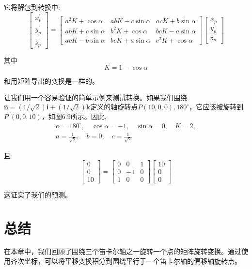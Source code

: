它将解包到转换中:
$$
\left[\begin{array}{c}
x_{p}^{\prime} \\
y_{p}^{\prime} \\
z_{p}^{\prime}
\end{array}\right]=\left[\begin{array}{ccc}
a^{2} K+\cos \alpha & a b K-c \sin \alpha & a c K+b \sin \alpha \\
a b K+c \sin \alpha & b^{2} K+\cos \alpha & b c K-a \sin \alpha \\
a c K-b \sin \alpha & b c K+a \sin \alpha & c^{2} K+\cos \alpha
\end{array}\right]\left[\begin{array}{c}
x_{p} \\
y_{p} \\
z_{p}
\end{array}\right]
$$

其中
$$
K=1-\cos \alpha
$$

和用矩阵导出的变换是一样的。

让我们用一个容易验证的简单示例来测试转换。如果我们围绕$\hat{\mathbf{n}}=(1 / \sqrt{2}) \mathbf{i}+(1 / \sqrt{2}) \mathbf{k}$定义的轴旋转点$P(10,0,0), 180^{\circ}$，它应该被旋转到$P^{\prime}(0,0,10)$，如图6.9所示。因此,
$$
\begin{gathered}
\alpha=180^{\circ}, \quad \cos \alpha=-1, \quad \sin \alpha=0, \quad K=2, \\
a=\frac{1}{\sqrt{2}}, \quad b=0, \quad c=\frac{1}{\sqrt{2}}
\end{gathered}
$$

且
$$
\left[\begin{array}{c}
0 \\
0 \\
10
\end{array}\right]=\left[\begin{array}{ccc}
0 & 0 & 1 \\
0 & -1 & 0 \\
1 & 0 & 0
\end{array}\right]\left[\begin{array}{c}
10 \\
0 \\
0
\end{array}\right]
$$

这证实了我们的预测。

\section{总结}
在本章中，我们回顾了围绕三个笛卡尔轴之一旋转一个点的矩阵旋转变换。通过使用齐次坐标，可以将平移变换积分到围绕平行于一个笛卡尔轴的偏移轴旋转点。

